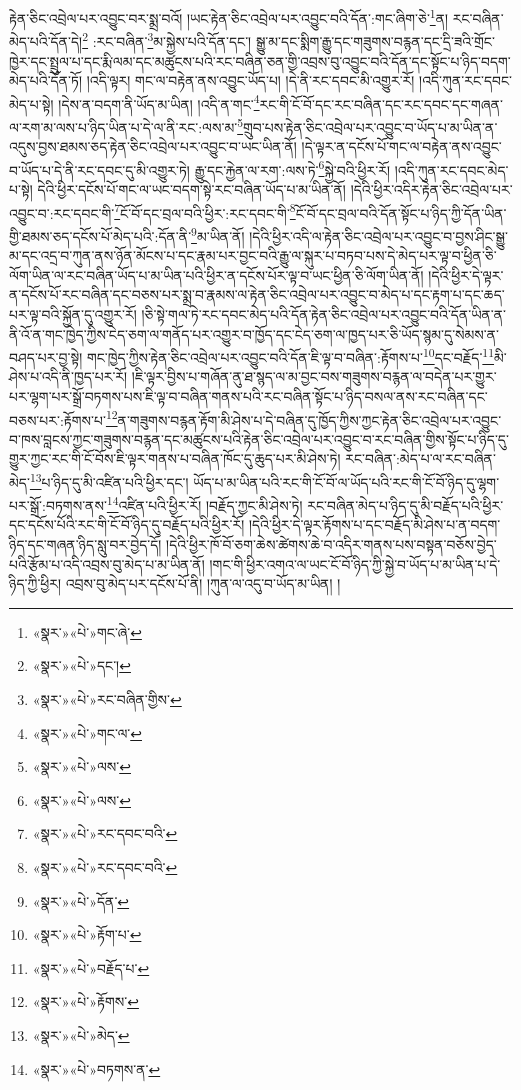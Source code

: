 རྟེན་ཅིང་འབྲེལ་པར་འབྱུང་བར་སྨྲ་བའོ། །ཡང་རྟེན་ཅིང་འབྲེལ་པར་འབྱུང་བའི་དོན་:གང་ཞིག་ཅེ་\footnote{«སྣར་»«པེ་»གང་ཞེ་}ན། རང་བཞིན་མེད་པའི་དོན་དེ།\footnote{«སྣར་»«པེ་»དང་།} :རང་བཞིན་\footnote{«སྣར་»«པེ་»རང་བཞིན་གྱིས་}མ་སྐྱེས་པའི་དོན་དང་། སྒྱུ་མ་དང་སྨིག་རྒྱུ་དང་གཟུགས་བརྙན་དང་དྲི་ཟའི་གྲོང་ཁྱེར་དང་སྤྲུལ་པ་དང་རྨི་ལམ་དང་མཚུངས་པའི་རང་བཞིན་ཅན་གྱི་འབྲས་བུ་འབྱུང་བའི་དོན་དང་སྟོང་པ་ཉིད་བདག་མེད་པའི་དོན་ཏོ། །འདི་ལྟར། གང་ལ་བརྟེན་ནས་འབྱུང་ཡོད་པ། །དེ་ནི་རང་དབང་མི་འགྱུར་རོ། །འདི་ཀུན་རང་དབང་མེད་པ་སྟེ། །དེས་ན་བདག་ནི་ཡོད་མ་ཡིན། །འདི་ན་གང་\footnote{«སྣར་»«པེ་»གང་ལ་}རང་གི་ངོ་བོ་དང་རང་བཞིན་དང་རང་དབང་དང་གཞན་ལ་རག་མ་ལས་པ་ཉིད་ཡིན་པ་དེ་ལ་ནི་རང་:ལས་མ་\footnote{«སྣར་»«པེ་»ལས་}གྲུབ་པས་རྟེན་ཅིང་འབྲེལ་པར་འབྱུང་བ་ཡོད་པ་མ་ཡིན་ན་འདུས་བྱས་ཐམས་ཅད་རྟེན་ཅིང་འབྲེལ་པར་འབྱུང་བ་ཡང་ཡིན་ནོ། །དེ་ལྟར་ན་དངོས་པོ་གང་ལ་བརྟེན་ནས་འབྱུང་བ་ཡོད་པ་དེ་ནི་རང་དབང་དུ་མི་འགྱུར་ཏེ། རྒྱུ་དང་རྐྱེན་ལ་རག་:ལས་ཏེ་\footnote{«སྣར་»«པེ་»ལས་}སྐྱེ་བའི་ཕྱིར་རོ། །འདི་ཀུན་རང་དབང་མེད་པ་སྟེ། དེའི་ཕྱིར་དངོས་པོ་གང་ལ་ཡང་བདག་སྟེ་རང་བཞིན་ཡོད་པ་མ་ཡིན་ནོ། །དེའི་ཕྱིར་འདིར་རྟེན་ཅིང་འབྲེལ་པར་འབྱུང་བ་:རང་དབང་གི་\footnote{«སྣར་»«པེ་»རང་དབང་བའི་}ངོ་བོ་དང་བྲལ་བའི་ཕྱིར་:རང་དབང་གི་\footnote{«སྣར་»«པེ་»རང་དབང་བའི་}ངོ་བོ་དང་བྲལ་བའི་དོན་སྟོང་པ་ཉིད་ཀྱི་དོན་ཡིན་གྱི་ཐམས་ཅད་དངོས་པོ་མེད་པའི་:དོན་ནི་\footnote{«སྣར་»«པེ་»དོན་}མ་ཡིན་ནོ། །དེའི་ཕྱིར་འདི་ལ་རྟེན་ཅིང་འབྲེལ་པར་འབྱུང་བ་བྱས་ཤིང་སྒྱུ་མ་དང་འདྲ་བ་ཀུན་ནས་ཉོན་མོངས་པ་དང་རྣམ་པར་བྱང་བའི་རྒྱུ་ལ་སྐུར་པ་བཏབ་པས་དེ་མེད་པར་ལྟ་བ་ཕྱིན་ཅི་ལོག་ཡིན་ལ་རང་བཞིན་ཡོད་པ་མ་ཡིན་པའི་ཕྱིར་ན་དངོས་པོར་ལྟ་བ་ཡང་ཕྱིན་ཅི་ལོག་ཡིན་ནོ། །དེའི་ཕྱིར་དེ་ལྟར་ན་དངོས་པོ་རང་བཞིན་དང་བཅས་པར་སྨྲ་བ་རྣམས་ལ་རྟེན་ཅིང་འབྲེལ་པར་འབྱུང་བ་མེད་པ་དང་རྟག་པ་དང་ཆད་པར་ལྟ་བའི་སྐྱོན་དུ་འགྱུར་རོ། །ཅི་སྟེ་གལ་ཏེ་རང་དབང་མེད་པའི་དོན་རྟེན་ཅིང་འབྲེལ་པར་འབྱུང་བའི་དོན་ཡིན་ན་ནི་འོ་ན་གང་ཁྱེད་ཀྱིས་ངེད་ཅག་ལ་གནོད་པར་འགྱུར་བ་ཁྱོད་དང་ངེད་ཅག་ལ་ཁྱད་པར་ཅི་ཡོད་སྙམ་དུ་སེམས་ན་བཤད་པར་བྱ་སྟེ། གང་ཁྱེད་ཀྱིས་རྟེན་ཅིང་འབྲེལ་པར་འབྱུང་བའི་དོན་ཇི་ལྟ་བ་བཞིན་:རྟོགས་པ་\footnote{«སྣར་»«པེ་»རྟོག་པ་}དང་བརྗོད་\footnote{«སྣར་»«པེ་»བརྗོད་པ་}མི་ཤེས་པ་འདི་ནི་ཁྱད་པར་རོ། །ཇི་ལྟར་བྱིས་པ་གཞོན་ནུ་ཐ་སྙད་ལ་མ་བྱང་བས་གཟུགས་བརྙན་ལ་བདེན་པར་གྱུར་པར་ལྷག་པར་སྒྲོ་བཏགས་པས་ཇི་ལྟ་བ་བཞིན་གནས་པའི་རང་བཞིན་སྟོང་པ་ཉིད་བསལ་ནས་རང་བཞིན་དང་བཅས་པར་:རྟོགས་པ་\footnote{«སྣར་»«པེ་»རྟོགས་}ན་གཟུགས་བརྙན་རྟོག་མི་ཤེས་པ་དེ་བཞིན་དུ་ཁྱོད་ཀྱིས་ཀྱང་རྟེན་ཅིང་འབྲེལ་པར་འབྱུང་བ་ཁས་བླངས་ཀྱང་གཟུགས་བརྙན་དང་མཚུངས་པའི་རྟེན་ཅིང་འབྲེལ་པར་འབྱུང་བ་རང་བཞིན་གྱིས་སྟོང་པ་ཉིད་དུ་གྱུར་ཀྱང་རང་གི་ངོ་བོས་ཇི་ལྟར་གནས་པ་བཞིན་ཁོང་དུ་ཆུད་པར་མི་ཤེས་ཏེ། རང་བཞིན་:མེད་པ་ལ་རང་བཞིན་མེད་\footnote{«སྣར་»«པེ་»མེད་}པ་ཉིད་དུ་མི་འཛིན་པའི་ཕྱིར་དང་། ཡོད་པ་མ་ཡིན་པའི་རང་གི་ངོ་བོ་ལ་ཡོད་པའི་རང་གི་ངོ་བོ་ཉིད་དུ་ལྷག་པར་སྒྲོ་:བཏགས་ནས་\footnote{«སྣར་»«པེ་»བཏགས་ན་}འཛིན་པའི་ཕྱིར་རོ། །བརྗོད་ཀྱང་མི་ཤེས་ཏེ། རང་བཞིན་མེད་པ་ཉིད་དུ་མི་བརྗོད་པའི་ཕྱིར་དང་དངོས་པོའི་རང་གི་ངོ་བོ་ཉིད་དུ་བརྗོད་པའི་ཕྱིར་རོ། །དེའི་ཕྱིར་དེ་ལྟར་རྟོགས་པ་དང་བརྗོད་མི་ཤེས་པ་ན་བདག་ཉིད་དང་གཞན་ཉིད་སླུ་བར་བྱེད་དོ། །དེའི་ཕྱིར་ཁོ་བོ་ཅག་ཆེས་ཚེགས་ཆེ་བ་འདིར་གནས་པས་བསྟན་བཅོས་བྱེད་པའི་རྩོམ་པ་འདི་འབྲས་བུ་མེད་པ་མ་ཡིན་ནོ། །གང་གི་ཕྱིར་འགའ་ལ་ཡང་ངོ་བོ་ཉིད་ཀྱི་སྐྱེ་བ་ཡོད་པ་མ་ཡིན་པ་དེ་ཉིད་ཀྱི་ཕྱིར། འབྲས་བུ་མེད་པར་དངོས་པོ་ནི། །ཀུན་ལ་འདུ་བ་ཡོད་མ་ཡིན། །
